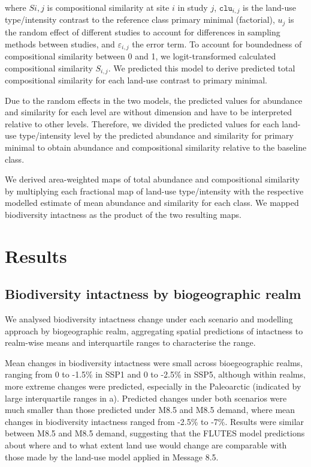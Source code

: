 \documentclass[titlesmallcaps,copyrightpage]{uomthesis}\usepackage[]{graphicx}\usepackage[]{color}
\begin{document}
 where \(S{i, j}\) is compositional similarity at site \(i\) in study \(j\), \(\texttt{clu}_{i, j}\) is the land-use type/intensity contrast to the reference class primary minimal (factorial), \(u_{j}\) is the random effect of different studies to account for differences in sampling methods between studies, and \(\varepsilon_{i,j}\) the error term. To account for boundedness of compositional similarity between 0 and 1, we logit-transformed calculated compositional similarity \(S_{i,j}\). We predicted this model to derive predicted total compositional similarity for each land-use contrast to primary minimal.

Due to the random effects in the two models, the predicted values for abundance and similarity for each level are without dimension and have to be interpreted relative to other levels. Therefore, we divided the predicted values for each land-use type/intensity level by the predicted abundance and similarity for primary minimal to obtain abundance and compositional similarity relative to the baseline class.

We derived area-weighted maps of total abundance and compositional similarity by multiplying each fractional map of land-use type/intensity with the respective modelled estimate of mean abundance and similarity for each class. We mapped biodiversity intactness as the product of the two resulting maps.

\section{Results}

\subsection{Biodiversity intactness by biogeographic realm}
We analysed biodiversity intactness change under each scenario and modelling approach by biogeographic realm, aggregating spatial predictions of intactness to realm-wise means and interquartile ranges to characterise the range.

Mean changes in biodiversity intactness were small across bioegeographic realms, ranging from 0 to -1.5\% in SSP1 and 0 to -2.5\% in SSP5, although within realms, more extreme changes were predicted, especially in the Paleoarctic (indicated by large interquartile ranges in a). Predicted changes under both scenarios were much smaller than those predicted under M8.5 and M8.5 demand, where mean changes in biodiversity intactness ranged from -2.5\% to -7\%. Results were similar between M8.5 and M8.5 demand, suggesting that the FLUTES model predictions about where and to what extent land use would change are comparable with those made by the land-use model applied in Message 8.5.
\end{document}
